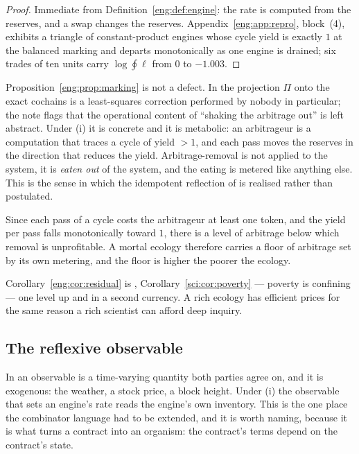 \begin{proof}
Immediate from Definition~\ref{eng:def:engine}: the rate is computed from the
reserves, and a swap changes the reserves. Appendix~\ref{eng:app:repro},
block~(4), exhibits a triangle of constant-product engines whose cycle
yield is exactly $1$ at the balanced marking and departs monotonically as
one engine is drained; six trades of ten units carry
$\log \oint \ell$ from $0$ to $-1.003$.
\end{proof}

\begin{remark}\label{eng:trading-what-removes-arbitrage}
Proposition~\ref{eng:prop:marking} is not a defect. In \cite{vtok} the
projection $\Pi$ onto the exact cochains is a least-squares correction
performed by nobody in particular; the note flags that the operational
content of ``shaking the arbitrage out'' is left abstract. Under (i) it is
concrete and it is metabolic: an arbitrageur is a computation that traces a
cycle of yield $> 1$, and each pass moves the reserves in the direction
that reduces the yield. Arbitrage-removal is not applied to the system, it
is \emph{eaten out} of the system, and the eating is metered like anything
else. This is the sense in which the idempotent reflection of
\cite[Prop.~3.4]{vtok} is realised rather than postulated.
\end{remark}

\begin{corollary}\label{eng:cor:residual}
Since each pass of a cycle costs the arbitrageur at least one token, and
the yield per pass falls monotonically toward $1$, there is a level of
arbitrage below which removal is unprofitable. A mortal ecology therefore
carries a floor of arbitrage set by its own metering, and the floor is
higher the poorer the ecology.
\end{corollary}

Corollary~\ref{eng:cor:residual} is \chSci, Corollary~\ref{sci:cor:poverty} --- poverty is
confining --- one level up and in a second currency. A rich ecology has
efficient prices for the same reason a rich scientist can afford deep
inquiry.

\subsection{The reflexive observable}\label{eng:S3.3}

In \cite{SPJ2000} an observable is a time-varying quantity both parties
agree on, and it is exogenous: the weather, a stock price, a block height.
Under (i) the observable that sets an engine's rate reads the engine's own
inventory. This is the one place the combinator language had to be
extended, and it is worth naming, because it is what turns a contract into
an organism: the contract's terms depend on the contract's state.

